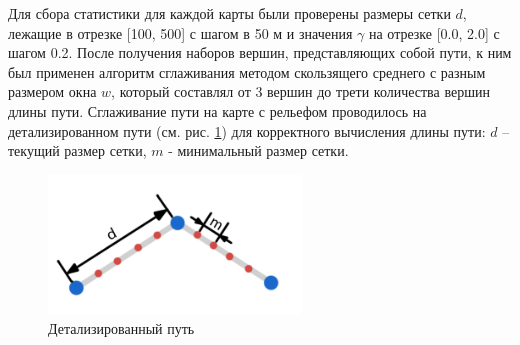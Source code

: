 Для сбора статистики для каждой карты были проверены размеры сетки
$d$, лежащие в отрезке [100, 500] с шагом в 50 м и значения $\gamma$ на отрезке [0.0, 2.0] с шагом 0.2. После получения наборов вершин, представляющих собой
пути, к ним был применен алгоритм сглаживания методом скользящего
среднего с разным размером окна $w$, который составлял от 3 вершин до трети
количества вершин длины пути. Сглаживание пути на карте с рельефом
проводилось на детализированном пути (см. рис. \ref{pic:detailed_path}) для корректного
вычисления длины пути: $d$ – текущий размер сетки, $m$ - минимальный размер
сетки.
\begin{figure}[H]
	\includegraphics[width=0.6\textwidth]{images/3_13.png}
	\caption{Детализированный путь}
	\label{pic:detailed_path}
\end{figure}
\vspace{2mm}
